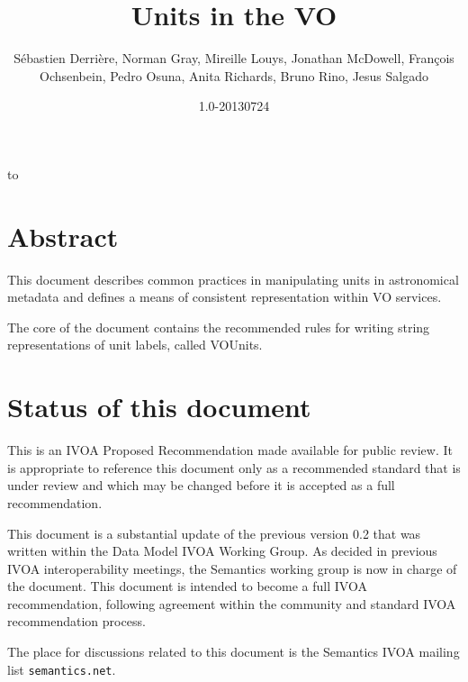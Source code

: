 \documentclass[11pt,notitlepage,onecolumn]{ivoa}
\title{Units in the VO}
\date{1.0-20130724}
\author{S\'{e}bastien Derri\`ere,
Norman Gray,
Mireille Louys,
Jonathan McDowell,
Fran\c{c}ois Ochsenbein,
Pedro Osuna,
Anita Richards,
Bruno Rino,
Jesus Salgado}
\begin{document}
\maketitle %
\thispagestyle{empty}
\begingroup
\vfill
\hbox to \textwidth{\hfil\tiny code.google.com/p/volute, rev\SVNRevision, \SVNDate}
\endgroup
\newpage
\tableofcontents 
\newpage
\listoftables
\newpage
\section*{Abstract}

This document describes common practices in manipulating
units in astronomical metadata and defines a means of consistent
representation within VO services.

The core of the document contains the recommended rules for writing string representations 
of unit labels, called VOUnits.

\section*{Status of this document}

This is an IVOA Proposed Recommendation made available for public review.
It is appropriate to reference this document only as a recommended standard 
that is under review and which may be changed before it is accepted as a full recommendation.


This document is a substantial update of the previous version 0.2 that
was written within the Data Model IVOA Working Group. As decided in previous
IVOA interoperability meetings, the Semantics working group is now in charge 
of the document. This document is intended to become a full IVOA recommendation,
following agreement within the community and standard IVOA recommendation process.

The place for discussions related to this document is the
Semantics IVOA mailing list {\tt semantics\@@ivoa.net}.

\end{document}

